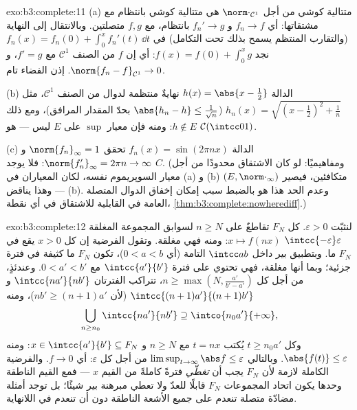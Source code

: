 \begin{solution}{exo:b3:complete:11}
(a) متتالية كوشي من أجل $\norm\cdot_{\mathcal C^1}$ هي متتالية كوشي بانتظام مع
مشتقاتها: أي $f_n \to f$ و $f_n' \to g$ بانتظام، مع $f, g$
متصلتين. وبالانتقال إلى النهاية (والتقارب المنتظم يسمح بذلك
تحت التكامل) في $f_n(x) = f_n(0) + \int_0^xf_n'(t)\,\dd t$ نجد $f(x) = f(0) + \int_0^xg$: أي إن $f$ من الصنف
$\mathcal C^1$ مع $f' = g$، و $\norm{f_n - f}_{\mathcal C^1} \to 0$. إذن الفضاء تام.

(b) الدالة $h(x) = \abs{x - \frac12}$ نهايةٌ منتظمة لدوال من الصنف
$\mathcal C^1$، مثل $h_n(x) = \sqrt{(x -
\frac12)^2 + \frac1n}$ ($\abs{h_n - h} \leq \frac1{\sqrt n}$ بحدّ المقدار المرافق)،
ومع ذلك $h \notin E$: ومنه فإن معيار $\sup$ على $E$ ليس
 ---  هو $\mathcal C(\intcc01)$.

(c) الدالة $f_n(x) = \sin(2\pi nx)$ تحقق $\norm{f_n}_\infty = 1$ و $\norm{f_n'}_\infty = 2\pi n \to \infty$: فلا يوجد $C$.
(ومفاهيميًا: لو كان الاشتقاق محدودًا من أجل معيار السوپريموم نفسه،
لكان المعياران في (a) و (b) متكافئين، فيصير $(E, \norm\cdot_\infty)$  ---
وهذا يناقض (b). وعدم الحد هذا هو بالضبط سبب إمكان إخفاق الدوال
المتصلة العامة في القابلية للاشتقاق في أي نقطة، \cref{thm:b3:complete:nowherediff}.)
\end{solution}

\begin{solution}{exo:b3:complete:12}
لنثبّت $\varepsilon > 0$. كل $F_N$ تقاطعٌ على $n
\geq N$ لسوابق المجموعة
المغلقة $\intcc{-\varepsilon}
\varepsilon$  $x \mapsto f(nx)$: ومنه فهي مغلقة. وتقول
الفرضية إن كل $x > 0$ يقع في $F_N$ ما. وبتطبيق بير داخل
$\intcc ab$ التامة (أي $0 < a <
b$)، تكون $F_N$ ما كثيفة في فترة
جزئية؛ وبما أنها مغلقة، فهي تحتوي على فترة $\intcc{a'}{b'}$ مع
$0 < a' < b'$. وعندئذٍ، من أجل كل $n \geq \max(N, \frac{a'}{b' - a'})$، تتراكب الفترتان
$\intcc{na'}{nb'}$ و $\intcc{(n+1)a'}{(n+1)b'}$ (لأن $nb' \geq (n+1)a'$)، ومنه
\[
\bigcup_{n \geq n_0}\intcc{na'}{nb'} \supseteq
\intco{n_0a'}{+\infty},
\]
وكل $t \geq n_0a'$ يُكتب $t = nx$ مع $n \geq N$ و $x \in
\intcc{a'}{b'} \subseteq F_N$:
ومنه $\abs{f(t)} \leq \varepsilon$. وبالتالي $\limsup_{t\to\infty}\abs f \leq \varepsilon$ من أجل كل $\varepsilon$: أي
$f \to 0$. والفرضية الكاملة لازمة لأن $F_N$ يجب أن \emph{تغطّي}
فترةً كاملةً من القيم $x$ --- فمع القيم الناطقة وحدها يكون
اتحاد المجموعات $F_N$ قابلًا للعدّ ولا تعطي مبرهنة بير شيئًا؛ بل
توجد أمثلة مضادّة متصلة تنعدم على جميع الأشعة الناطقة دون أن
تنعدم في اللانهاية.
\end{solution}

